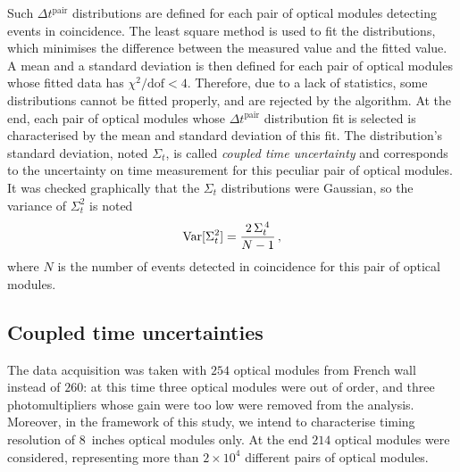 Such  $\Delta t^{\text{pair}}$ distributions are defined for each pair of optical modules detecting events in coincidence.
The least square method is used to fit the distributions, which minimises the difference between the measured value and the fitted value.
A mean and a standard deviation is then defined for each pair of optical modules whose fitted data has $\chi^{2}/\text{dof}<4$.
Therefore, due to a lack of statistics, some distributions cannot be fitted properly, and are rejected by the algorithm.
At the end, each pair of optical modules whose $\Delta t^{\text{pair}}$ distribution fit is selected is characterised by the mean and standard deviation of this fit.
The distribution's standard deviation, noted $\Sigma_{t}$, is called \emph{coupled time uncertainty} and corresponds to the uncertainty on time measurement for this peculiar pair of optical modules.
It was checked graphically that the $\Sigma_{t}$ distributions were Gaussian, so the variance of $\Sigma_{t}^{2}$ is noted
\begin{equation}
  \mathrm{Var}[\Sigma_{t}^{2}] = \frac{2\,\Sigma_{t}^{\,4}}{N-1}\,,
  \label{eq:var_sigma_pair}
\end{equation}
where $N$ is the number of events detected in coincidence for this pair of optical modules.

\subsection{Coupled time uncertainties}

The data acquisition was taken with $254$ optical modules from French wall instead of $260$: at this time three optical modules were out of order, and three photomultipliers whose gain were too low were removed from the analysis.
Moreover, in the framework of this study, we intend to characterise timing resolution of $8$~inches optical modules only.
At the end $214$ optical modules were considered, representing more than ${2\times10^{4}}$ different pairs of optical modules.


